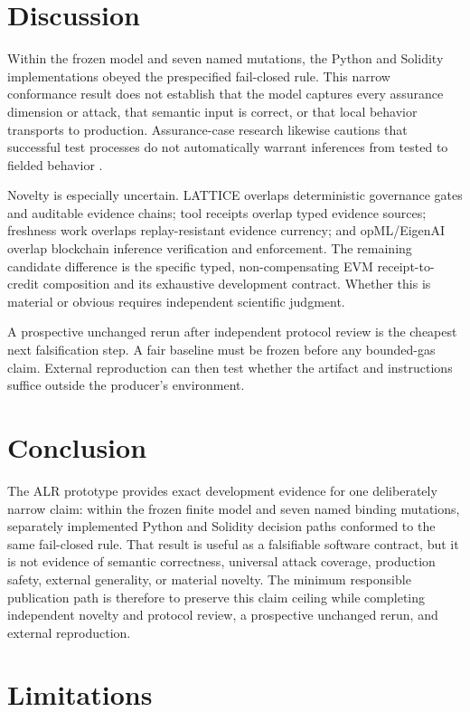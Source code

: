 \documentclass[10pt]{article}
\begin{document}
\clearpage
\section{Discussion}

Within the frozen model and seven named mutations, the Python and Solidity
implementations obeyed the prespecified fail-closed rule. This narrow conformance
result does not establish that the model captures every assurance dimension or
attack, that semantic input is correct, or that local behavior transports to
production. Assurance-case research likewise cautions that successful test processes
do not automatically warrant inferences from tested to fielded behavior
\cite{richard2026agentic}.

Novelty is especially uncertain. LATTICE overlaps deterministic governance gates and
auditable evidence chains; tool receipts overlap typed evidence sources; freshness
work overlaps replay-resistant evidence currency; and opML/EigenAI overlap blockchain
inference verification and enforcement. The remaining candidate difference is the
specific typed, non-compensating EVM receipt-to-credit composition and its exhaustive
development contract. Whether this is material or obvious requires independent
scientific judgment.

A prospective unchanged rerun after independent protocol review is the cheapest next
falsification step. A fair baseline must be frozen before any bounded-gas claim.
External reproduction can then test whether the artifact and instructions suffice
outside the producer's environment.

\section{Conclusion}

The ALR prototype provides exact development evidence for one deliberately narrow
claim: within the frozen finite model and seven named binding mutations, separately
implemented Python and Solidity decision paths conformed to the same fail-closed rule.
That result is useful as a falsifiable software contract, but it is not evidence of
semantic correctness, universal attack coverage, production safety, external
generality, or material novelty. The minimum responsible publication path is therefore
to preserve this claim ceiling while completing independent novelty and protocol
review, a prospective unchanged rerun, and external reproduction.

\section{Limitations}
\end{document}
